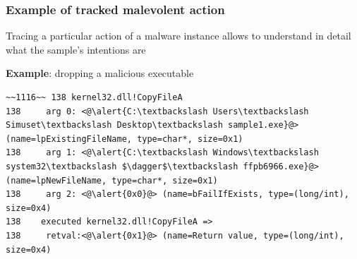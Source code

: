 \documentclass[compress]{beamer}
\begin{document}
\begin{frame}[fragile]
    \frametitle{Example of tracked malevolent action}

\begin{beamerboxesrounded}[shadow=true]{}
Tracing a particular action of a malware instance allows to understand in detail what the sample's intentions are
\end{beamerboxesrounded}
\bigskip    
\textbf{Example}: dropping a malicious executable
\vspace*{0.3cm}
    
	

\begin{lstlisting}
~~1116~~ 138 kernel32.dll!CopyFileA
138 	arg 0: <@\alert{C:\textbackslash Users\textbackslash Simuset\textbackslash Desktop\textbackslash sample1.exe}@> 
(name=lpExistingFileName, type=char*, size=0x1)
138 	arg 1: <@\alert{C:\textbackslash Windows\textbackslash system32\textbackslash $\dagger$\textbackslash ffpb6966.exe}@> 
(name=lpNewFileName, type=char*, size=0x1)
138 	arg 2: <@\alert{0x0}@> (name=bFailIfExists, type=(long/int), size=0x4)
138    executed kernel32.dll!CopyFileA =>
138 	retval:<@\alert{0x1}@> (name=Return value, type=(long/int), size=0x4)
\end{lstlisting}

\end{frame}
\end{document}
